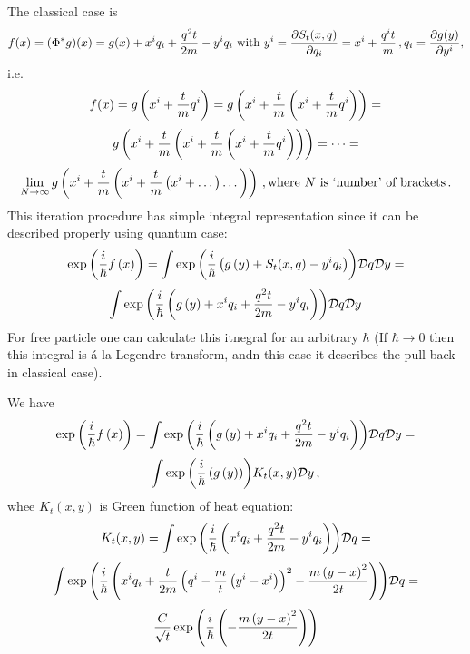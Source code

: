 The classical case is
        $$
f(x)=(\Phi^* g)(x)=g(x)+x^iq_i+
{q^2t\over 2m}-y^iq_i \,\, \hbox
{with}\,\,y^i={\partial S_t(x,q)\over \partial q_i}=x^i+{q^i t\over m}\,,
q_i={\partial g(y)\over \partial y^i},   
        $$
i.e.
      $$
f(x)=
g\left(x^i+{t\over m}q^i\right)
=
g\left(x^i+{t\over m}\left(x^i+{t\over m}q^i\right)\right)
=
          $$
          $$
g\left(x^i+{t\over m}\left(x^i+{t\over m}
\left(x^i+{t\over m}q^i\right)
\right)\right)
    =\dots=
	$$
           $$
    \lim_{N\to \infty
}g\left(x^i+{t\over m}\left(x^i+{t\over m}
\left(x^i+\dots\right)
\dots
\right)\right)\,,
\hbox {where $N$ is `number' of brackets}\,.
	$$
  This iteration procedure  has simple integral
representation since 
it can be described properly using quantum case:
           $$
\exp{\left({i\over \hbar}f\left(x\right)\right)}
      =
\int\exp{\left({i\over \hbar}\left(
    g\left(y\right)+S_t(x,q)-y^iq_i
      \right)\right)}
   {\cal D}q         
   {\cal D}y=         
           $$
        $$
\int\exp{\left({i\over \hbar}\left(
    g\left(y\right)+x^iq_i+
    {q^2t\over 2m}-y^iq_i
      \right)\right)}
   {\cal D}q         
   {\cal D}y        $$
For free particle one can calculate this itnegral  for
an arbitrary
  $\hbar$  (If $\hbar\to 0$ then this integral is \'a la
Legendre transform, andn this case it describes the pull
back in classical case).

We have
            $$
\exp{\left({i\over \hbar}f\left(x\right)\right)}
      =
\int \exp{\left({i\over \hbar}\left(
    g\left(y\right)+x^iq_i+{q^2t\over 2m}-y^iq_i
      \right)\right)}
   {\cal D}q         
   {\cal D}y=         
           $$
      $$
   \int 
     \exp{
      \left(
  {i\over \hbar}
       \left(
     g\left(y\right)
      \right)
    \right)
        }
          K_t(x,y)     
   {\cal D}y\,,
      $$
whee $K_t(x,y)$ is Green function of heat equation:
        $$
      K_t(x,y)=
 \int \exp{\left({i\over \hbar}
        \left(
   x^iq_i+{q^2t\over 2m}-y^iq_i
      \right)\right)}
   {\cal D}q         
 =     
       $$
         $$
      \int \exp{\left({i\over \hbar}\left(
     x^iq_i+{t\over 2m}
   \left(q^i-{m\over t}\left(y^i-x^i\right)
         \right)^2
      -{m\left(y-x\right)^2\over 2t}
      \right)\right)}
   {\cal D}q
     =
          $$
           $$
    {C\over \sqrt t}         
           \exp
            {\left(
        {i\over \hbar}
           \left(
      -{m\left(y-x\right)^2\over 2t}
           \right)
            \right)
              }
             $$




\bye
